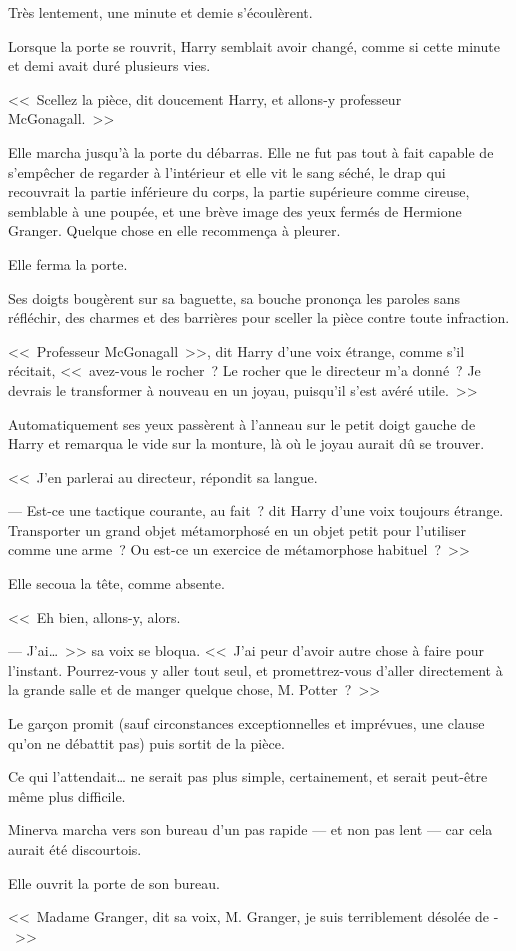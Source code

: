 Très lentement, une minute et demie s'écoulèrent.

\later

Lorsque la porte se rouvrit, Harry semblait avoir changé, comme si cette minute et demi avait duré plusieurs vies.

<<~Scellez la pièce, dit doucement Harry, et allons-y professeur McGonagall.~>>

Elle marcha jusqu'à la porte du débarras. Elle ne fut pas tout à fait capable de s'empêcher de regarder à l'intérieur et elle vit le sang séché, le drap qui recouvrait la partie inférieure du corps, la partie supérieure comme cireuse, semblable à une poupée, et une brève image des yeux fermés de Hermione Granger. Quelque chose en elle recommença à pleurer.

Elle ferma la porte.

Ses doigts bougèrent sur sa baguette, sa bouche prononça les paroles sans réfléchir, des charmes et des barrières pour sceller la pièce contre toute infraction.

<<~Professeur McGonagall~>>, dit Harry d'une voix étrange, comme s'il récitait, <<~avez-vous le rocher~? Le rocher que le directeur m'a donné~? Je devrais le transformer à nouveau en un joyau, puisqu'il s'est avéré utile.~>>

Automatiquement ses yeux passèrent à l'anneau sur le petit doigt gauche de Harry et remarqua le vide sur la monture, là où le joyau aurait dû se trouver.

<<~J'en parlerai au directeur, répondit sa langue.

--- Est-ce une tactique courante, au fait~? dit Harry d'une voix toujours étrange. Transporter un grand objet métamorphosé en un objet petit pour l'utiliser comme une arme~? Ou est-ce un exercice de métamorphose habituel~?~>>

Elle secoua la tête, comme absente.

<<~Eh bien, allons-y, alors.

--- J'ai…~>> sa voix se bloqua. <<~J'ai peur d'avoir autre chose à faire pour l'instant. Pourrez-vous y aller tout seul, et promettrez-vous d'aller directement à la grande salle et de manger quelque chose, M. Potter~?~>>

Le garçon promit (sauf circonstances exceptionnelles et imprévues, une clause qu'on ne débattit pas) puis sortit de la pièce.

Ce qui l'attendait… ne serait pas plus simple, certainement, et serait peut-être même plus difficile.

\later

Minerva marcha vers son bureau d'un pas rapide — et non pas lent — car cela aurait été discourtois.

Elle ouvrit la porte de son bureau.

<<~Madame Granger, dit sa voix, M. Granger, je suis terriblement désolée de -~>>
